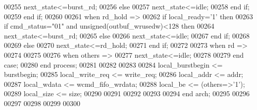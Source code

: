 \begin{DoxyCode}
00255                     \textcolor{vhdlchar}{next_state}\textcolor{vhdlchar}{<=}\textcolor{vhdlchar}{burst\_rd};
00256                 \textcolor{keywordflow}{else} 
00257                     \textcolor{vhdlchar}{next_state}\textcolor{vhdlchar}{<=}\textcolor{vhdlchar}{idle};
00258                 \textcolor{keywordflow}{end} \textcolor{keywordflow}{if};
00259             \textcolor{keywordflow}{end} \textcolor{keywordflow}{if};
00260 
00261         \textcolor{keywordflow}{when} \textcolor{vhdlchar}{rd\_hold} \textcolor{vhdlchar}{=}\textcolor{vhdlchar}{>}
00262             \textcolor{keywordflow}{if} \textcolor{vhdlchar}{local_ready}\textcolor{vhdlchar}{=}\textcolor{vhdlchar}{'}\textcolor{vhdllogic}{}\textcolor{vhdllogic}{1}\textcolor{vhdlchar}{'} \textcolor{keywordflow}{then} 
00263                 \textcolor{keywordflow}{if} \textcolor{vhdlchar}{cmd_status}\textcolor{vhdlchar}{=}\textcolor{vhdllogic}{"01"} \textcolor{keywordflow}{and} \textcolor{comment}{unsigned}\textcolor{vhdlchar}{(}\textcolor{vhdlchar}{outbuf_wrusedw}\textcolor{vhdlchar}{)}\textcolor{vhdlchar}{<}\textcolor{vhdllogic}{}\textcolor{vhdllogic}{128} \textcolor{keywordflow}{then}
00264                     \textcolor{vhdlchar}{next_state}\textcolor{vhdlchar}{<=}\textcolor{vhdlchar}{burst\_rd};
00265                 \textcolor{keywordflow}{else} 
00266                     \textcolor{vhdlchar}{next_state}\textcolor{vhdlchar}{<=}\textcolor{vhdlchar}{idle};
00267                 \textcolor{keywordflow}{end} \textcolor{keywordflow}{if};
00268 
00269             \textcolor{keywordflow}{else} 
00270                 \textcolor{vhdlchar}{next_state}\textcolor{vhdlchar}{<=}\textcolor{vhdlchar}{rd\_hold};
00271             \textcolor{keywordflow}{end} \textcolor{keywordflow}{if};
00272 
00273         \textcolor{keywordflow}{when} \textcolor{vhdlchar}{rd} \textcolor{vhdlchar}{=}\textcolor{vhdlchar}{>} 
00274  
00275 
00276         \textcolor{keywordflow}{when} \textcolor{keywordflow}{others} \textcolor{vhdlchar}{=}\textcolor{vhdlchar}{>} 
00277             \textcolor{vhdlchar}{next_state}\textcolor{vhdlchar}{<=}\textcolor{vhdlchar}{idle};
00278 
00279     \textcolor{keywordflow}{end} \textcolor{keywordflow}{case};
00280 \textcolor{keywordflow}{end} \textcolor{keywordflow}{process};
00281 
00282 
00283 
00284 local\_burstbegin    <= burstbegin;
00285 local\_write\_req <= write\_req;
00286 local\_addr          <= addr;
00287 local\_wdata         <= wcmd\_fifo\_wrdata;
00288 local\_be                <= (others=>'1');
00289 local\_size          <= size;
00290 
00291 
00292 
00293   
00294 \textcolor{keywordflow}{end} \textcolor{vhdlchar}{arch};   
00295 
00296 
00297 
00298 
00299 
00300 
\end{DoxyCode}
